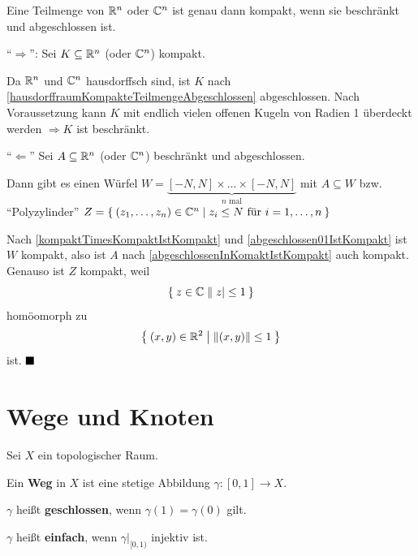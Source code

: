 \begin{satz}\label{satz:heine-borel}%
    Eine Teilmenge von $\mathbb{R}^n$ oder $\mathbb{C}^n$ ist genau dann kompakt,
    wenn sie beschränkt und abgeschlossen ist.
\end{satz}

\begin{beweis}\leavevmode
    \enquote{$\Rightarrow$}: Sei $K \subseteq \mathbb{R}^n$ (oder $\mathbb{C}^n$)
    kompakt.

    Da $\mathbb{R}^n$ und $\mathbb{C}^n$ hausdorffsch sind, ist $K$ nach
    \cref{hausdorffraumKompakteTeilmengeAbgeschlossen} abgeschlossen.
    Nach Voraussetzung kann $K$ mit endlich vielen offenen Kugeln von 
    Radien 1 überdeckt werden $\Rightarrow K$ ist beschränkt.

    \enquote{$\Leftarrow$} Sei $A \subseteq \mathbb{R}^n$ (oder $\mathbb{C}^n$)
    beschränkt und abgeschlossen.

    Dann gibt es einen Würfel $W = \underbrace{[-N, N] \times \dots \times [-N, N]}_{n \text{ mal}}$
    mit $A \subseteq W$ bzw. \enquote{Polyzylinder}
    $Z = \Set{(z_1, \dots, z_n) \in \ensuremath{\mathbb{C}}^n | z_i \leq N \text{ für } i= 1, \dots, n}$

    Nach \cref{kompaktTimesKompaktIstKompakt} und
    \cref{abgeschlossen01IstKompakt} ist $W$ kompakt, also ist $A$
    nach \cref{abgeschlossenInKomaktIstKompakt} auch kompakt.
    Genauso ist $Z$ kompakt, weil 
    \[\Set{z \in \ensuremath{\mathbb{C}}| |z| \leq 1}\]
    homöomorph zu
    \[\Set{(x,y) \in \ensuremath{\mathbb{R}}^2 | \|(x,y)\| \leq 1}\]
    ist. $\qed$
\end{beweis}

\section{Wege und Knoten}
\begin{definition}%
    Sei $X$ ein topologischer Raum. 
    \begin{defenum}
        \item Ein \textbf{Weg} in $X$ ist eine stetige Abbildung $\gamma:[0,1] \rightarrow X$.
        \item $\gamma$ heißt \textbf{geschlossen}, wenn $\gamma(1) = \gamma(0)$ gilt.
        \item $\gamma$ heißt \textbf{einfach}, wenn $\gamma|_{[0,1)}$ 
              injektiv ist.
    \end{defenum}
\end{definition}

